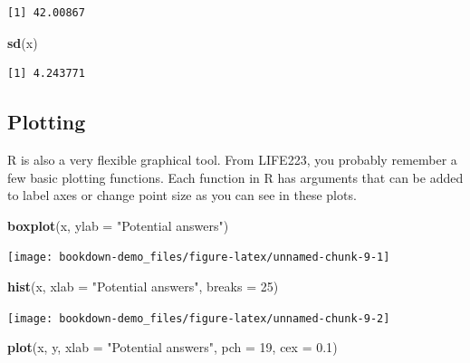 \documentclass[
]{book}
\newenvironment{Shaded}{\begin{snugshade}}{\end{snugshade}}
\newcommand{\DataTypeTok}[1]{\textcolor[rgb]{0.13,0.29,0.53}{#1}}
\newcommand{\DecValTok}[1]{\textcolor[rgb]{0.00,0.00,0.81}{#1}}
\newcommand{\FloatTok}[1]{\textcolor[rgb]{0.00,0.00,0.81}{#1}}
\newcommand{\KeywordTok}[1]{\textcolor[rgb]{0.13,0.29,0.53}{\textbf{#1}}}
\newcommand{\NormalTok}[1]{#1}
\newcommand{\StringTok}[1]{\textcolor[rgb]{0.31,0.60,0.02}{#1}}
\begin{document}
\begin{verbatim}
[1] 42.00867
\end{verbatim}

\begin{Shaded}
\begin{Highlighting}[]
\KeywordTok{sd}\NormalTok{(x)}
\end{Highlighting}
\end{Shaded}

\begin{verbatim}
[1] 4.243771
\end{verbatim}

\hypertarget{plotting}{%
\subsection{Plotting}\label{plotting}}

R is also a very flexible graphical tool. From LIFE223, you probably remember a few basic plotting functions. Each function in R has arguments that can be added to label axes or change point size as you can see in these plots.

\begin{Shaded}
\begin{Highlighting}[]
\KeywordTok{boxplot}\NormalTok{(x, }\DataTypeTok{ylab =} \StringTok{"Potential answers"}\NormalTok{)}
\end{Highlighting}
\end{Shaded}

\begin{center}\texttt{[image: bookdown-demo\_files/figure-latex/unnamed-chunk-9-1]} \end{center}

\begin{Shaded}
\begin{Highlighting}[]
\KeywordTok{hist}\NormalTok{(x, }\DataTypeTok{xlab =} \StringTok{"Potential answers"}\NormalTok{, }\DataTypeTok{breaks =} \DecValTok{25}\NormalTok{)}
\end{Highlighting}
\end{Shaded}

\begin{center}\texttt{[image: bookdown-demo\_files/figure-latex/unnamed-chunk-9-2]} \end{center}

\begin{Shaded}
\begin{Highlighting}[]
\KeywordTok{plot}\NormalTok{(x, y, }\DataTypeTok{xlab =} \StringTok{"Potential answers"}\NormalTok{, }\DataTypeTok{pch =} \DecValTok{19}\NormalTok{, }\DataTypeTok{cex =} \FloatTok{0.1}\NormalTok{)}
\end{Highlighting}
\end{Shaded}
\end{document}
